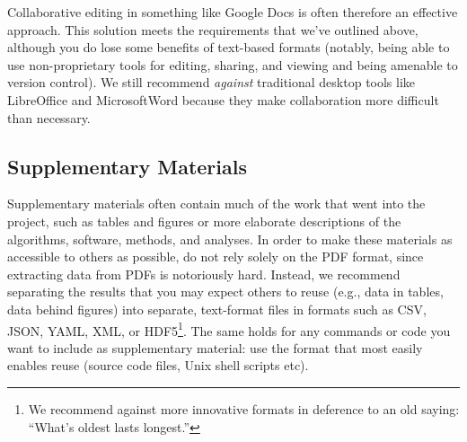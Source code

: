 \documentclass[10pt,letterpaper]{article}
\newcommand{\withurl}[2]{{#1}\footnote{{\texttt{#2}}}}
\begin{document}




Collaborative editing in something like Google Docs is often therefore
an effective approach. This solution meets the requirements that we've
outlined above, although you do lose some benefits of text-based
formats (notably, being able to use non-proprietary tools for editing,
sharing, and viewing and being amenable to version control). We still
recommend \emph{against} traditional desktop tools like LibreOffice
and Microsoft\textregistered Word because they make collaboration more
difficult than necessary.

\subsection*{Supplementary Materials}

Supplementary materials often contain much of the work that went into
the project, such as tables and figures or more elaborate descriptions
of the algorithms, software, methods, and analyses. In order to make
these materials as accessible to others as possible, do not rely
solely on the PDF format, since extracting data from PDFs is
notoriously hard.  Instead, we recommend separating the results that
you may expect others to reuse (e.g., data in tables, data behind
figures) into separate, text-format files in formats such as CSV,
JSON, YAML, XML, or HDF5\footnote{We recommend against more innovative
formats in deference to an old saying: ``What's oldest lasts
longest.''}.  The same holds for any commands or code you want to
include as supplementary material: use the format that most easily
enables reuse (source code files, Unix shell scripts etc).
\end{document}
